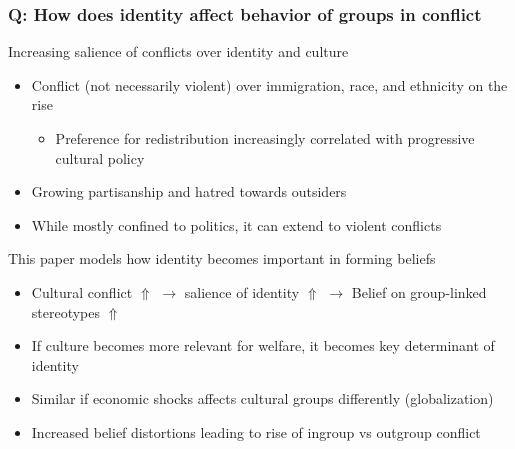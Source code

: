 \documentclass[aspectratio=169]{beamer}
\begin{document}
\begin{frame}
\frametitle{Q: How does identity affect behavior of groups in conflict} 
Increasing salience of conflicts over identity and culture
\begin{itemize}\setlength\itemsep{3pt}
\item Conflict (not necessarily violent) over immigration, race, and ethnicity on the rise
\begin{itemize}
\item Preference for redistribution increasingly correlated with progressive cultural policy
\end{itemize}
\item Growing partisanship and hatred towards outsiders
\item While mostly confined to politics, it can extend to violent conflicts
\end{itemize}\medskip
This paper models how identity becomes important in forming beliefs
\begin{itemize}\setlength\itemsep{3pt}
\item Cultural conflict $\Uparrow$ $\to$ salience of identity $\Uparrow$ $\to$ Belief on group-linked stereotypes $\Uparrow$
\item If culture becomes more relevant for welfare, it becomes key determinant of identity
\item Similar if economic shocks affects cultural groups differently (globalization)
\item Increased belief distortions leading to rise of ingroup vs outgroup conflict
\end{itemize}\medskip
\end{frame}
\end{document}
